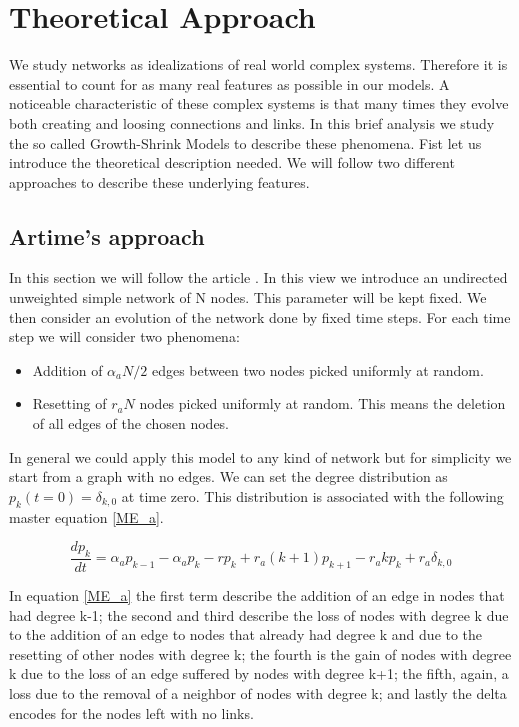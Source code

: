 \chapter{Theoretical Approach}


We study networks as idealizations of real world complex systems. Therefore it is essential to count for as many real features as possible in our models. A noticeable characteristic of these complex systems is that many times they evolve both creating and loosing connections and links. In this brief analysis we study the so called Growth-Shrink Models to describe these phenomena.
Fist let us introduce the theoretical description needed. We will follow two different approaches to describe these underlying features. 

\section{Artime's approach}

In this section we will follow the article \cite{artime2022stochastic}.
In this view we introduce an undirected unweighted simple network of N nodes. This parameter will be kept fixed. We then consider an evolution of the network done by fixed time steps. For each time step we will consider two phenomena:
\begin{itemize}
    \item Addition of $\alpha_a N / 2$ edges between two nodes picked uniformly at random.
    \item Resetting of $r_a N$ nodes picked uniformly at random. This means the deletion of all edges of the chosen nodes.
\end{itemize}
In general we could apply this model to any kind of network but for simplicity we start from a graph with no edges. We can set the degree distribution as $p_{k}(t=0)= \delta_{k,0}$ at time zero. This distribution is associated with the following master equation \eqref{ME_a}.

\begin{equation}
\frac{dp_{k}}{dt} = \alpha_a p_{k-1} - \alpha_a p_{k} - rp_{k}+ r_a (k+1)p_{k+1} - r_a kp_{k} + r_a \delta_{k,0} \label{ME_a}
\end{equation}

In equation \eqref{ME_a} the first term describe the addition of an edge in nodes that had degree k-1; the second and third describe the loss of nodes with degree k due to the addition of an edge to nodes that already had degree k and due to the resetting of other nodes with degree k; the fourth is the gain of nodes with degree k due to the loss of an edge suffered by nodes with degree k+1; the fifth, again, a loss due to the removal of a neighbor of nodes with degree k; and lastly the delta encodes for the nodes left with no links.


